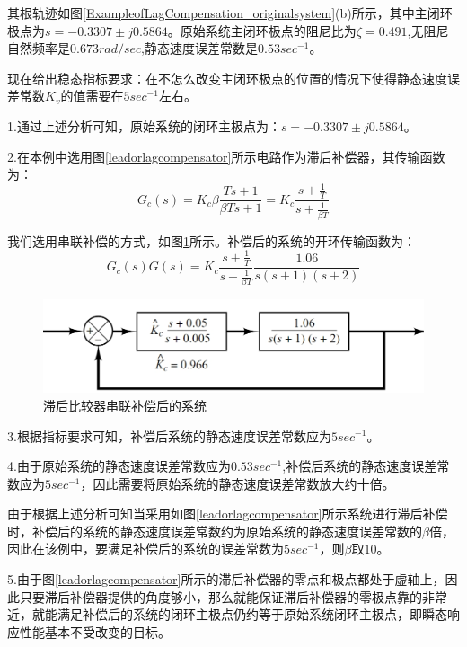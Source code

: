 \documentclass{article}
\numberwithin{equation}{section}
\numberwithin{figure}{section}
\begin{document}
其根轨迹如图\ref{ExampleofLagCompensation_originalsystem}(b)所示，其中主闭环极点为$s=-0.3307 \pm j0.5864$。原始系统主闭环极点的阻尼比为$\zeta = 0.491$,无阻尼自然频率是$0.673rad/sec$,静态速度误差常数是$0.53sec^{-1}$。

现在给出稳态指标要求：在不怎么改变主闭环极点的位置的情况下使得静态速度误差常数$K_v$的值需要在$5sec^{-1}$左右。

1.通过上述分析可知，原始系统的闭环主极点为：$s=-0.3307 \pm j0.5864$。

2.在本例中选用图\ref{leadorlagcompensator}所示电路作为滞后补偿器，其传输函数为：
\begin{equation}
    G_c(s)=K_c\beta\frac{Ts+1}{\beta Ts+1}=K_c\frac{s+\frac{1}{T}}{s+\frac{1}{\beta T}}
\end{equation}

我们选用串联补偿的方式，如图\ref{ExampleofLagCompensation_post-compensatedsystem}所示。补偿后的系统的开环传输函数为：
\begin{equation}
    G_c(s)G(s)=K_c\frac{s+\frac{1}{T}}{s+\frac{1}{\beta T}}\frac{1.06}{s(s+1)(s+2)}
\end{equation}

\begin{figure}
    \centering
    \includegraphics[width=.6\textwidth]{Chapter6/ExampleofLagCompensation_post-compensatedsystem.png} %
    \caption{滞后比较器串联补偿后的系统} %
    \label{ExampleofLagCompensation_post-compensatedsystem} %
\end{figure}

3.根据指标要求可知，补偿后系统的静态速度误差常数应为$5sec^{-1}$。

4.由于原始系统的静态速度误差常数应为$0.53sec^{-1}$,补偿后系统的静态速度误差常数应为$5sec^{-1}$，因此需要将原始系统的静态速度误差常数放大约十倍。

由于根据上述分析可知当采用如图\ref{leadorlagcompensator}所示系统进行滞后补偿时，补偿后的系统的静态速度误差常数约为原始系统的静态速度误差常数的$\beta$倍，因此在该例中，要满足补偿后的系统的误差常数为$5sec^{-1}$，则$\beta$取$10$。

5.由于图\ref{leadorlagcompensator}所示的滞后补偿器的零点和极点都处于虚轴上，因此只要滞后补偿器提供的角度够小，那么就能保证滞后补偿器的零极点靠的非常近，就能满足补偿后的系统的闭环主极点仍约等于原始系统闭环主极点，即瞬态响应性能基本不受改变的目标。
\end{document}
